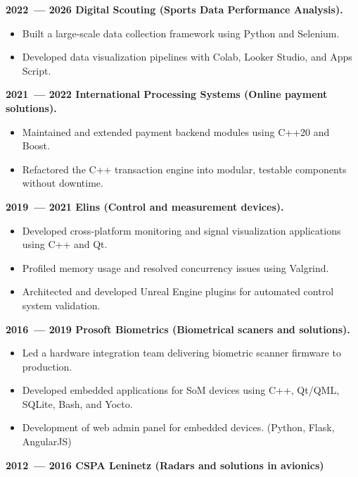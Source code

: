 \documentclass[a4paper,oneside,12pt]{article}
\begin{document}
{\bf
2022~--- 2026 Digital Scouting (Sports Data Performance Analysis).
}
\begin{itemize}
    \setlength{\itemsep}{-2pt}
    \item Built a large-scale data collection framework using Python and Selenium.
    \item Developed data visualization pipelines with Colab, Looker Studio, and Apps Script.
\end{itemize}

{\bf
2021~--- 2022 International Processing Systems (Online payment solutions).
}
\begin{itemize}
    \setlength{\itemsep}{-2pt}
    \item Maintained and extended payment backend modules using C++20 and Boost.
    \item Refactored the C++ transaction engine into modular, testable components without downtime.
\end{itemize}

{\bf
2019~--- 2021 Elins (Control and measurement devices).
}
\begin{itemize}
    \setlength{\itemsep}{-2pt}
    \item Developed cross-platform monitoring and signal visualization applications using C++ and Qt.
    \item Profiled memory usage and resolved concurrency issues using Valgrind.
    \item Architected and developed Unreal Engine plugins for automated control system validation.
\end{itemize}

{\bf
2016~--- 2019 Prosoft Biometrics (Biometrical scaners and solutions).
}
\begin{itemize}
    \setlength{\itemsep}{-2pt}
    \item Led a hardware integration team delivering biometric scanner firmware to production.
    \item Developed embedded applications for SoM devices using C++, Qt/QML, SQLite, Bash, and Yocto.
    \item Development of web admin panel for embedded devices. (Python, Flask, AngularJS)
\end{itemize}

{\bf
2012~--- 2016 CSPA Leninetz (Radars and solutions in avionics)
}
\end{document}
